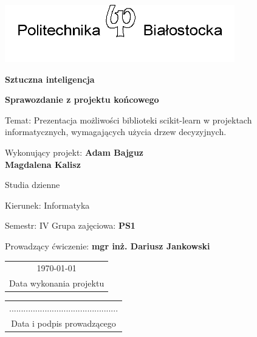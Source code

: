 \documentclass[10pt,a4paper]{article}
\begin{document}
\begin{titlepage}
	\centering
	\includegraphics[width=10cm]{PB_logo}\par\vspace{1cm}

	{\LARGE\bfseries Sztuczna inteligencja \par}
	\vspace{0.5cm}
	
	{\LARGE\bfseries Sprawozdanie z projektu końcowego\par}
	\vspace{1.5cm}
	
	{\Large Temat: Prezentacja możliwości biblioteki scikit-learn w projektach informatycznych, wymagających użycia drzew decyzyjnych.\par}
	\vspace{3cm}
	
	\raggedright
	
	
 	{\large Wykonujący projekt: \textbf{Adam Bajguz}\\
 			\makebox[0pt][l]{}\phantom{Wykonujący projekt: }\textbf{Magdalena Kalisz}\par}
 	\vspace{1cm}
 	
 	{\large Studia dzienne \par
	Kierunek: Informatyka \par
	Semestr: IV \hspace{2.5cm} Grupa zajęciowa: \textbf{PS1} \par
	Prowadzący ćwiczenie: \textbf{mgr inż. Dariusz Jankowski} \par}
 	
	\vfill
		
	\begin{tabular}{c}
	\today\\
	Data wykonania projektu
	\end{tabular}
	
	\begin{flushright}
	\begin{tabular}{c}
	..............................................\\
	Data i podpis prowadzącego
	\end{tabular}
	\end{flushright}

\end{titlepage}
\end{document}
